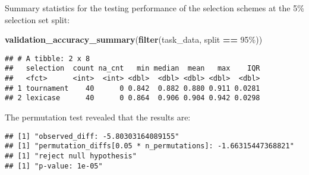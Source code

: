 \documentclass[
]{book}
\newenvironment{Shaded}{\begin{snugshade}}{\end{snugshade}}
\newcommand{\AttributeTok}[1]{\textcolor[rgb]{0.13,0.29,0.53}{#1}}
\newcommand{\DecValTok}[1]{\textcolor[rgb]{0.00,0.00,0.81}{#1}}
\newcommand{\FunctionTok}[1]{\textcolor[rgb]{0.13,0.29,0.53}{\textbf{#1}}}
\newcommand{\NormalTok}[1]{#1}
\newcommand{\OtherTok}[1]{\textcolor[rgb]{0.56,0.35,0.01}{#1}}
\newcommand{\SpecialCharTok}[1]{\textcolor[rgb]{0.81,0.36,0.00}{\textbf{#1}}}
\newcommand{\StringTok}[1]{\textcolor[rgb]{0.31,0.60,0.02}{#1}}
\begin{document}
Summary statistics for the testing performance of the selection schemes at the 5\% selection set split:

\begin{Shaded}
\begin{Highlighting}[]
\FunctionTok{validation\_accuracy\_summary}\NormalTok{(}\FunctionTok{filter}\NormalTok{(task\_data, split }\SpecialCharTok{==} \StringTok{\textquotesingle{}95\%\textquotesingle{}}\NormalTok{))}
\end{Highlighting}
\end{Shaded}

\begin{verbatim}
## # A tibble: 2 x 8
##   selection  count na_cnt   min median  mean   max    IQR
##   <fct>      <int>  <int> <dbl>  <dbl> <dbl> <dbl>  <dbl>
## 1 tournament    40      0 0.842  0.882 0.880 0.911 0.0281
## 2 lexicase      40      0 0.864  0.906 0.904 0.942 0.0298
\end{verbatim}

The permutation test revealed that the results are:

\begin{Shaded}
\end{Shaded}

\begin{verbatim}
## [1] "observed_diff: -5.80303164089155"
## [1] "permutation_diffs[0.05 * n_permutations]: -1.66315447368821"
## [1] "reject null hypothesis"
## [1] "p-value: 1e-05"
\end{verbatim}
\end{document}
